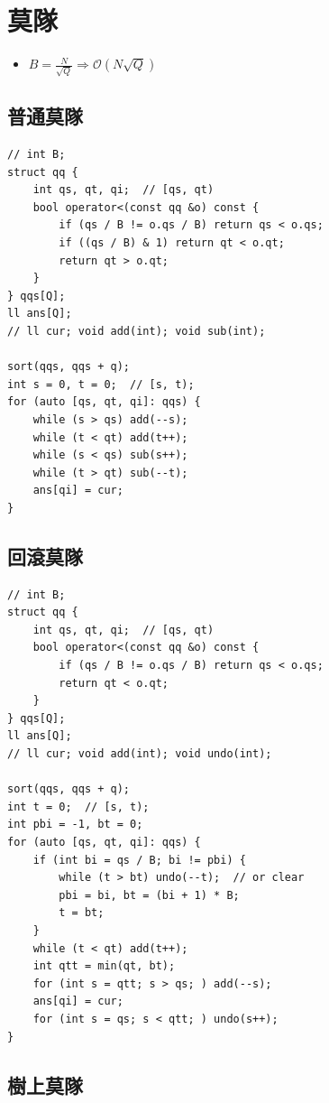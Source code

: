 \documentclass[10pt, a4paper, twocolumn]{article}
\begin{document}
\section{莫隊}

\begin{itemize}[tight_item]
    \item $B = \frac{N}{\sqrt{Q}} \Rightarrow \mathcal{O}(N \sqrt{Q})$
\end{itemize}

\subsection*{普通莫隊}

\begin{verbatim}
// int B;
struct qq {
    int qs, qt, qi;  // [qs, qt)
    bool operator<(const qq &o) const {
        if (qs / B != o.qs / B) return qs < o.qs;
        if ((qs / B) & 1) return qt < o.qt;
        return qt > o.qt;
    }
} qqs[Q];
ll ans[Q];
// ll cur; void add(int); void sub(int);

sort(qqs, qqs + q);
int s = 0, t = 0;  // [s, t);
for (auto [qs, qt, qi]: qqs) {
    while (s > qs) add(--s);
    while (t < qt) add(t++);
    while (s < qs) sub(s++);
    while (t > qt) sub(--t);
    ans[qi] = cur;
}
\end{verbatim}

\subsection*{回滾莫隊}

\begin{verbatim}
// int B;
struct qq {
    int qs, qt, qi;  // [qs, qt)
    bool operator<(const qq &o) const {
        if (qs / B != o.qs / B) return qs < o.qs;
        return qt < o.qt;
    }
} qqs[Q];
ll ans[Q];
// ll cur; void add(int); void undo(int);

sort(qqs, qqs + q);
int t = 0;  // [s, t);
int pbi = -1, bt = 0;
for (auto [qs, qt, qi]: qqs) {
    if (int bi = qs / B; bi != pbi) {
        while (t > bt) undo(--t);  // or clear
        pbi = bi, bt = (bi + 1) * B;
        t = bt;
    }
    while (t < qt) add(t++);
    int qtt = min(qt, bt);
    for (int s = qtt; s > qs; ) add(--s);
    ans[qi] = cur;
    for (int s = qs; s < qtt; ) undo(s++);
}
\end{verbatim}

\newpage

\subsection*{樹上莫隊}
\end{document}
